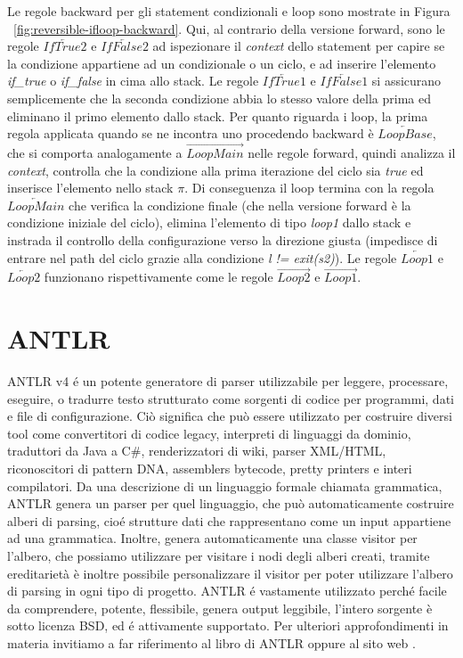 \documentclass{article}
\theoremstyle{plain}
\theoremstyle{definition}
\theoremstyle{plain}
\newcommand{\s}{\pi}
\begin{document}
Le regole backward per gli statement condizionali e loop sono mostrate in Figura ~\ref{fig:reversible-ifloop-backward}. Qui, al contrario della versione forward, sono le regole $\overleftarrow{\mathit{IfTrue2}}$ e $\overleftarrow{\mathit{IfFalse2}}$ ad ispezionare il \emph{context} dello statement per capire se la condizione appartiene ad un condizionale o un ciclo, e ad inserire l'elemento \emph{if\_true} o \emph{if\_false} in cima allo stack. Le regole $\overleftarrow{\mathit{IfTrue1}}$ e $\overleftarrow{\mathit{IfFalse1}}$ si assicurano semplicemente che la seconda condizione abbia lo stesso valore della prima ed eliminano il primo elemento dallo stack. Per quanto riguarda i loop, la prima regola applicata quando se ne incontra uno procedendo backward è $\overleftarrow{\mathit{LoopBase}}$, che si comporta analogamente a $\overrightarrow{\mathit{LoopMain}}$ nelle regole forward, quindi analizza il \emph{context}, controlla che la condizione alla prima iterazione del ciclo sia \emph{true} ed inserisce l'elemento nello stack $\s$. Di conseguenza il loop termina con la regola $\overleftarrow{\mathit{LoopMain}}$ che verifica la condizione finale (che nella versione forward è la condizione iniziale del ciclo), elimina l'elemento di tipo \emph{loop1} dallo stack e instrada il controllo della configurazione verso la direzione giusta (impedisce di entrare nel path del ciclo grazie alla condizione \emph{l != exit(s2)}). Le regole $\overleftarrow{\mathit{Loop1}}$ e $\overleftarrow{\mathit{Loop2}}$ funzionano rispettivamente come le regole $\overrightarrow{\mathit{Loop2}}$ e $\overrightarrow{\mathit{Loop1}}$.

\section{ANTLR}
ANTLR v4 é un potente generatore di parser utilizzabile per leggere, processare, eseguire, o tradurre testo strutturato come sorgenti di codice per programmi, dati e file di configurazione. Ciò significa che può essere utilizzato per costruire diversi tool come convertitori di codice legacy, interpreti di linguaggi da dominio, traduttori da Java a C\#, renderizzatori di wiki, parser XML/HTML, riconoscitori di pattern DNA, assemblers bytecode, pretty printers e interi compilatori. Da una descrizione di un linguaggio formale chiamata grammatica, ANTLR genera un parser per quel linguaggio, che può automaticamente costruire alberi di parsing, cioé strutture dati che rappresentano come un input appartiene ad una grammatica. Inoltre, genera automaticamente una classe visitor per l'albero, che possiamo utilizzare per visitare i nodi degli alberi creati, tramite ereditarietà è inoltre possibile personalizzare il visitor per poter utilizzare l'albero di parsing in ogni tipo di progetto. ANTLR é vastamente utilizzato perché facile da comprendere, potente, flessibile, genera output leggibile, l'intero sorgente è sotto licenza BSD, ed é attivamente supportato. Per ulteriori approfondimenti in materia invitiamo a far riferimento al libro di ANTLR \cite{antlr} oppure al sito web \cite{antlrwebsite}.
\end{document}
